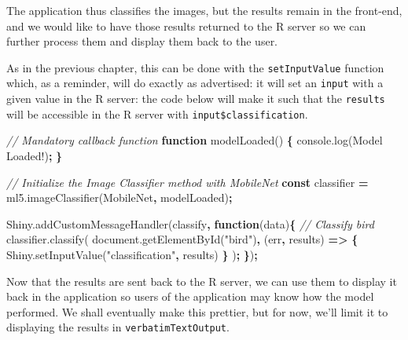 \documentclass[
  10pt,
]{krantz}
\makeatletter
\newenvironment{Shaded}{\begin{snugshade}}{\end{snugshade}}
\newcommand{\AttributeTok}[1]{\textcolor[rgb]{0.61,0.61,0.61}{#1}}
\newcommand{\CommentTok}[1]{\textcolor[rgb]{0.37,0.37,0.37}{\textit{#1}}}
\newcommand{\KeywordTok}[1]{\textcolor[rgb]{0.27,0.27,0.27}{\textbf{#1}}}
\newcommand{\NormalTok}[1]{#1}
\newcommand{\OperatorTok}[1]{\textcolor[rgb]{0.43,0.43,0.43}{\textbf{#1}}}
\newcommand{\StringTok}[1]{\textcolor[rgb]{0.5,0.5,0.5}{#1}}
\newcommand{\VariableTok}[1]{\textcolor[rgb]{0,0,0}{#1}}
\newenvironment{kframe}{%
\medskip{}
\setlength{\fboxsep}{.8em}
 \def\at@end@of@kframe{}%
 \ifinner\ifhmode%
  \def\at@end@of@kframe{\end{minipage}}%
  \begin{minipage}{\columnwidth}%
 \fi\fi%
 \def\FrameCommand##1{\hskip\@totalleftmargin \hskip-\fboxsep
 \colorbox{shadecolor}{##1}\hskip-\fboxsep
     \hskip-\linewidth \hskip-\@totalleftmargin \hskip\columnwidth}%
 \MakeFramed {\advance\hsize-\width
   \@totalleftmargin\z@ \linewidth\hsize
   \@setminipage}}%
 {\par\unskip\endMakeFramed%
 \at@end@of@kframe}
\renewenvironment{Shaded}{\begin{kframe}}{\end{kframe}}
\makeatother
\begin{document}
The application thus classifies the images, but the results remain in the front-end, and we would like to have those results returned to the R server so we can further process them and display them back to the user.

As in the previous chapter, this can be done with the \texttt{setInputValue} function which, as a reminder, will do exactly as advertised: it will set an \texttt{input} with a given value in the R server: the code below will make it such that the \texttt{results} will be accessible in the R server with \texttt{input\$classification}.

\begin{Shaded}
\begin{Highlighting}[]
\CommentTok{// Mandatory callback function}
\KeywordTok{function} \AttributeTok{modelLoaded}\NormalTok{() }\OperatorTok{\{}
  \VariableTok{console}\NormalTok{.}\AttributeTok{log}\NormalTok{(}\StringTok{\textquotesingle{}Model Loaded!\textquotesingle{}}\NormalTok{)}\OperatorTok{;}
\OperatorTok{\}}

\CommentTok{// Initialize the Image Classifier method with MobileNet}
\KeywordTok{const}\NormalTok{ classifier }\OperatorTok{=} \VariableTok{ml5}\NormalTok{.}\AttributeTok{imageClassifier}\NormalTok{(}\StringTok{\textquotesingle{}MobileNet\textquotesingle{}}\OperatorTok{,}\NormalTok{ modelLoaded)}\OperatorTok{;}

\VariableTok{Shiny}\NormalTok{.}\AttributeTok{addCustomMessageHandler}\NormalTok{(}\StringTok{\textquotesingle{}classify\textquotesingle{}}\OperatorTok{,} \KeywordTok{function}\NormalTok{(data)}\OperatorTok{\{}
  \CommentTok{// Classify bird}
  \VariableTok{classifier}\NormalTok{.}\AttributeTok{classify}\NormalTok{(}
    \VariableTok{document}\NormalTok{.}\AttributeTok{getElementById}\NormalTok{(}\StringTok{"bird"}\NormalTok{)}\OperatorTok{,}\NormalTok{ (err}\OperatorTok{,}\NormalTok{ results) }\KeywordTok{=>} \OperatorTok{\{}
      \VariableTok{Shiny}\NormalTok{.}\AttributeTok{setInputValue}\NormalTok{(}\StringTok{"classification"}\OperatorTok{,}\NormalTok{ results)}
    \OperatorTok{\}}
\NormalTok{  )}\OperatorTok{;}
\OperatorTok{\}}\NormalTok{)}\OperatorTok{;}
\end{Highlighting}
\end{Shaded}

Now that the results are sent back to the R server, we can use them to display it back in the application so users of the application may know how the model performed. We shall eventually make this prettier, but for now, we'll limit it to displaying the results in \texttt{verbatimTextOutput}.
\end{document}
